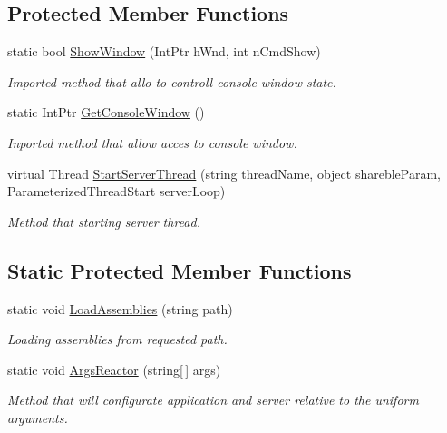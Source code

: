 \subsection*{Protected Member Functions}
\begin{DoxyCompactItemize}
\item 
static bool \mbox{\hyperlink{class_uniform_server_1_1_base_server_a16cf4f4f9de9d6d6586631640d3d867b}{Show\+Window}} (Int\+Ptr h\+Wnd, int n\+Cmd\+Show)
\begin{DoxyCompactList}\small\item\em Imported method that allo to controll console window state. \end{DoxyCompactList}\item 
static Int\+Ptr \mbox{\hyperlink{class_uniform_server_1_1_base_server_a1b7d5587de4974fad2ec366a571791e0}{Get\+Console\+Window}} ()
\begin{DoxyCompactList}\small\item\em Inported method that allow acces to console window. \end{DoxyCompactList}\item 
virtual Thread \mbox{\hyperlink{class_uniform_server_1_1_base_server_a27e52ba4c6bc40a47795085a7e3d03cd}{Start\+Server\+Thread}} (string thread\+Name, object shareble\+Param, Parameterized\+Thread\+Start server\+Loop)
\begin{DoxyCompactList}\small\item\em Method that starting server thread. \end{DoxyCompactList}\end{DoxyCompactItemize}
\subsection*{Static Protected Member Functions}
\begin{DoxyCompactItemize}
\item 
static void \mbox{\hyperlink{class_uniform_server_1_1_base_server_a22b92ad517cd1003fe4fe3c86d857169}{Load\+Assemblies}} (string path)
\begin{DoxyCompactList}\small\item\em Loading assemblies from requested path. \end{DoxyCompactList}\item 
static void \mbox{\hyperlink{class_uniform_server_1_1_base_server_a992660752da60019c348e18226a87bf2}{Args\+Reactor}} (string\mbox{[}$\,$\mbox{]} args)
\begin{DoxyCompactList}\small\item\em Method that will configurate application and server relative to the uniform arguments. \end{DoxyCompactList}\end{DoxyCompactItemize}
